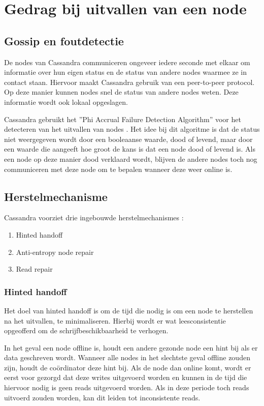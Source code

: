 \chapter{Gedrag bij uitvallen van een node}
\label{ch:cassandra_uitval}

\section{Gossip en foutdetectie}
De nodes van Cassandra communiceren ongeveer iedere seconde met elkaar om informatie over hun eigen status en de status van andere nodes waarmee ze in contact staan.
Hiervoor maakt Cassandra gebruik van een peer-to-peer protocol.
Op deze manier kunnen nodes snel de status van andere nodes weten.
Deze informatie wordt ook lokaal opgeslagen.

Cassandra gebruikt het ''Phi Accrual Failure Detection Algorithm'' voor het detecteren van het uitvallen van nodes \citep{kan2014cassandra}.
Het idee bij dit algoritme is dat de status niet weergegeven wordt door een booleaanse waarde, dood of levend, maar door een waarde die aangeeft hoe groot de kans is dat een node dood of levend is.
Als een node op deze manier dood verklaard wordt, blijven de andere nodes toch nog communiceren met deze node om te bepalen wanneer deze weer online is.

\section{Herstelmechanisme}
Cassandra voorziet drie ingebouwde herstelmechanismes \citep{strickland2014availability}:

\begin{enumerate}
	\item Hinted handoff
	\item Anti-entropy node repair
	\item Read repair
\end{enumerate}

\subsection{Hinted handoff}
Het doel van hinted handoff is om de tijd die nodig is om een node te herstellen na het uitvallen, te minimaliseren.
Hierbij wordt er wat leesconsistentie opgeofferd om de schrijfbeschikbaarheid te verhogen.

In het geval een node offline is, houdt een andere gezonde node een hint bij als er data geschreven wordt.
Wanneer alle nodes in het slechtste geval offline zouden zijn, houdt de coördinator deze hint bij.
Als de node dan online komt, wordt er eerst voor gezorgd dat deze writes uitgevoerd worden en kunnen in de tijd die hiervoor nodig is geen reads uitgevoerd worden.
Als in deze periode toch reads uitvoerd zouden worden, kan dit leiden tot inconsistente reads.

